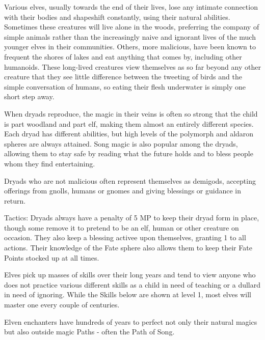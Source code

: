 \label{dryad}
\dryad

Various elves, usually towards the end of their lives, lose any intimate connection with their bodies and shapeshift constantly, using their natural abilities.  Sometimes these creatures will live alone in the woods, preferring the company of simple animals rather than the increasingly naive and ignorant lives of the much younger elves in their communities.  Others, more malicious, have been known to frequent the shores of lakes and eat anything that comes by, including other humanoids.  These long-lived creatures view themselves as so far beyond any other creature that they see little difference between the tweeting of birds and the simple conversation of humans, so eating their flesh underwater is simply one short step away.

	When dryads reproduce, the magic in their veins is often so strong that the child is part woodland and part elf, making them almost an entirely different species.  Each dryad has different abilities, but high levels of the polymorph and aldaron spheres are always attained.  Song magic is also popular among the dryads, allowing them to stay safe by reading what the future holds and to bless people whom they find entertaining.

	Dryads who are not malicious often represent themselves as demigods, accepting offerings from gnolls, humans or gnomes and giving blessings or guidance in return.

Tactics: Dryads always have a penalty of 5 MP to keep their dryad form in place, though some remove it to pretend to be an elf, human or other creature on occasion.  They also keep a blessing activee upon themselves, granting 1 to all actions.  Their knowledge of the Fate sphere also allows them to keep their Fate Points stocked up at all times.

\label{elf}
\elf

Elves pick up masses of skills over their long years and tend to view anyone who does not practice various different skills as a child in need of teaching or a dullard in need of ignoring.  While the Skills below are shown at level 1, most elves will master one every couple of centuries.

\label{elven_enchanter}
\elvenenchanter

Elven enchanters have hundreds of years to perfect not only their natural magics but also outside magic Paths - often the Path of Song.

